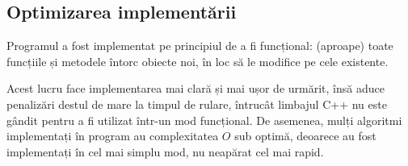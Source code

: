 \subsection{Optimizarea implementării}
Programul a fost implementat pe principiul de a fi funcțional: (aproape) toate
funcțiile și metodele întorc obiecte noi, în loc să le modifice pe cele
existente.

Acest lucru face implementarea mai clară și mai ușor de urmărit, însă aduce
penalizări destul de mare la timpul de rulare, întrucât limbajul C++ nu este
gândit pentru a fi utilizat într-un mod funcțional.
De asemenea, mulți algoritmi implementați în program au complexitatea $O$
sub optimă, deoarece au fost implementați în cel mai simplu mod, nu neapărat cel
mai rapid.
